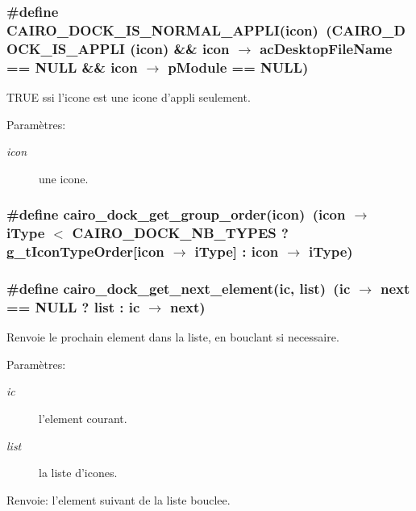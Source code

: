 \subsubsection{\setlength{\rightskip}{0pt plus 5cm}\#define CAIRO\_\-DOCK\_\-IS\_\-NORMAL\_\-APPLI(icon)~(CAIRO\_\-DOCK\_\-IS\_\-APPLI (icon) \&\& icon $\rightarrow$ acDesktopFileName == NULL \&\& icon $\rightarrow$ pModule == NULL)}\label{cairo-dock-icons_8h_6f3526bc8678e7cdef8eddcd8eccb80c}


TRUE ssi l'icone est une icone d'appli seulement. \begin{Desc}
\item[Paramètres:]
\begin{description}
\item[{\em icon}]une icone. \end{description}
\end{Desc}
\subsubsection{\setlength{\rightskip}{0pt plus 5cm}\#define cairo\_\-dock\_\-get\_\-group\_\-order(icon)~(icon $\rightarrow$ iType $<$ CAIRO\_\-DOCK\_\-NB\_\-TYPES ? {\bf g\_\-tIconTypeOrder}[icon $\rightarrow$ iType] : icon $\rightarrow$ iType)}\label{cairo-dock-icons_8h_322be2818009e6937b1047de969c7a94}


\subsubsection{\setlength{\rightskip}{0pt plus 5cm}\#define cairo\_\-dock\_\-get\_\-next\_\-element(ic, list)~(ic $\rightarrow$ next == NULL ? list : ic $\rightarrow$ next)}\label{cairo-dock-icons_8h_7ccbc1fbff09a250d0c35632113a9aa3}


Renvoie le prochain element dans la liste, en bouclant si necessaire. \begin{Desc}
\item[Paramètres:]
\begin{description}
\item[{\em ic}]l'element courant. \item[{\em list}]la liste d'icones. \end{description}
\end{Desc}
\begin{Desc}
\item[Renvoie:]l'element suivant de la liste bouclee. \end{Desc}
